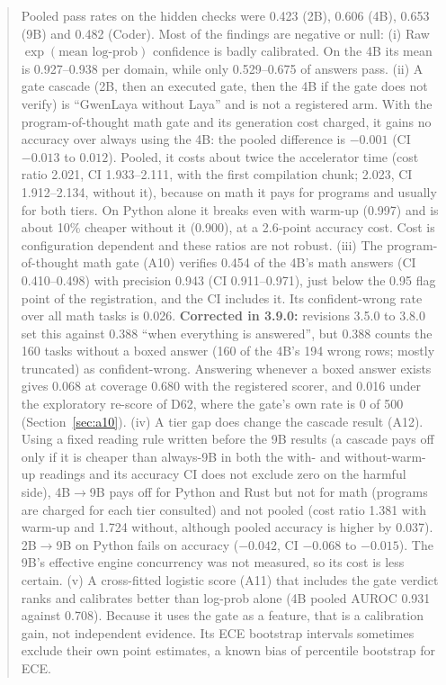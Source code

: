 \documentclass[11pt,a4paper]{article}
\begin{document}
\begin{abstract}
Pooled pass rates on the hidden checks were 0.423 (2B), 0.606 (4B), 0.653 (9B) and 0.482 (Coder).
Most of the findings are negative or null:
(i) Raw $\exp(\text{mean log-prob})$ confidence is badly calibrated. On the 4B its mean is
0.927--0.938 per domain, while only 0.529--0.675 of answers pass.
(ii) A gate cascade (2B, then an executed gate, then the 4B if the gate does not verify) is
``GwenLaya without Laya'' and is not a registered arm. With the program-of-thought math gate and its
generation cost charged, it gains no accuracy over always using the 4B: the pooled difference is
$-0.001$ (CI $-0.013$ to $0.012$). Pooled, it costs about twice the accelerator time (cost ratio 2.021,
CI 1.933--2.111, with the first compilation chunk; 2.023, CI 1.912--2.134, without it), because on math
it pays for programs and usually for both tiers. On Python alone it breaks even with warm-up (0.997) and
is about 10\% cheaper without it (0.900), at a 2.6-point accuracy cost. Cost is configuration dependent
and these ratios are not robust.
(iii) The program-of-thought math gate (A10) verifies 0.454 of the 4B's math answers (CI 0.410--0.498) with
precision 0.943 (CI 0.911--0.971), just below the 0.95 flag point of the registration, and the CI includes it.
Its confident-wrong rate over all math tasks is 0.026. \textbf{Corrected in 3.9.0:} revisions 3.5.0 to 3.8.0 set this against 0.388 ``when everything is answered'', but 0.388 counts the 160 tasks without a boxed answer (160 of the 4B's 194 wrong rows; mostly truncated) as confident-wrong. Answering whenever a boxed answer exists gives 0.068 at coverage 0.680 with the registered scorer, and 0.016 under the exploratory re-score of D62, where the gate's own rate is 0 of 500 (Section~\ref{sec:a10}).
(iv) A tier gap does change the cascade result (A12). Using a fixed reading rule written before the 9B
results (a cascade pays off only if it is cheaper than always-9B in both the with- and without-warm-up
readings and its accuracy CI does not exclude zero on the harmful side), 4B$\to$9B pays off for
Python and Rust but not for math (programs are charged for each tier consulted) and not pooled
(cost ratio 1.381 with warm-up and 1.724 without, although pooled accuracy is higher by 0.037).
2B$\to$9B on Python fails on accuracy ($-0.042$, CI $-0.068$ to $-0.015$). The 9B's effective engine
concurrency was not measured, so its cost is less certain.
(v) A cross-fitted logistic score (A11) that includes the gate verdict ranks and calibrates better than
log-prob alone (4B pooled AUROC 0.931 against 0.708). Because it uses the gate as a feature, that is a
calibration gain, not independent evidence. Its ECE bootstrap intervals sometimes exclude their own point
estimates, a known bias of percentile bootstrap for ECE.


\end{abstract}
\end{document}
